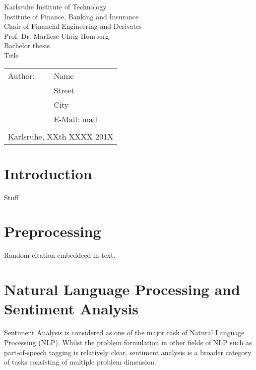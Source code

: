 \documentclass[a4paper,12pt]{article}%
\begin{document}
\begin{titlepage}
    \begin{center}
        {\Large Karlsruhe Institute of Technology\\[0.4cm]
            Institute of Finance, Banking and Insurance\\[0.3cm]
            Chair of Financial Engineering and Derivates\\[0.3cm]
            Prof. Dr. Marliese Uhrig-Homburg}\\[3.5cm]
        {\large Bachelor thesis}\\[1.5cm]
        {\Huge Title}\\[8cm]
    \end{center}
    \renewcommand{\baselinestretch}{1.2}\small\normalsize
    \begin{tabular}{ll}
        Author:  & Name\\
        & Street\\
        & City\\
        & E-Mail: mail\\\\
        \multicolumn{2}{l}{Karlsruhe, XXth XXXX 201X}
    \end{tabular}
    \vfill
\end{titlepage}

\sloppy

\onehalfspacing

\pagebreak%
\doublespacing %

\setcounter{page}{1}
\tableofcontents
\newpage
\listoffigures
{}
\newpage
\listoftables
{}
\newpage


\setcounter{page}{1}
\section{Introduction}
Stuff

\section{Preprocessing}
Random citation \cite{Socher2011} embeddeed in text.

\section{Natural Language Processing and Sentiment Analysis}
Sentiment Analysis is considered as one of the major task of Natural Language Processing (NLP). Whilst the problem formulation in other fields of NLP such as part-of-speech tagging is relatively clear, sentiment analysis is a broader category of tasks consisting of multiple problem dimension. 
\end{document}
